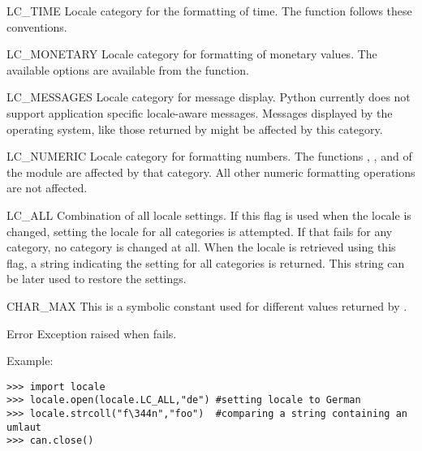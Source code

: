 \begin{datadesc}{LC_TIME}
Locale category for the formatting of time. The function
 follows these conventions.
\end{datadesc}

\begin{datadesc}{LC_MONETARY}
Locale category for formatting of monetary values. The available
options are available from the  function.
\end{datadesc}

\begin{datadesc}{LC_MESSAGES}
Locale category for message display. Python currently does not support
application specific locale-aware messages. Messages displayed by the
operating system, like those returned by  might
be affected by this category.
\end{datadesc}

\begin{datadesc}{LC_NUMERIC}
Locale category for formatting numbers. The functions
, ,  and  of the
 module are affected by that category. All other numeric
formatting operations are not affected.
\end{datadesc}

\begin{datadesc}{LC_ALL}
Combination of all locale settings. If this flag is used when the
locale is changed, setting the locale for all categories is
attempted. If that fails for any category, no category is changed at
all. When the locale is retrieved using this flag, a string indicating
the setting for all categories is returned. This string can be later
used to restore the settings.
\end{datadesc}

\begin{datadesc}{CHAR_MAX}
This is a symbolic constant used for different values returned by
.
\end{datadesc}

\begin{excdesc}{Error}
Exception raised when  fails.
\end{excdesc}

Example:

\bcode\begin{verbatim}
>>> import locale
>>> locale.open(locale.LC_ALL,"de") #setting locale to German
>>> locale.strcoll("f\344n","foo")  #comparing a string containing an umlaut 
>>> can.close()
\end{verbatim}\ecode
